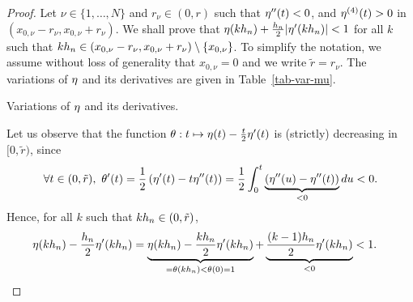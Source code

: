 \begin{proof}
  Let $\nu\in \{1,\ldots, N\}$ and $r_\nu\in (0,r)$ such that $\eta''(t)<0$, and $\eta^{(4)}(t)>0$ in $(x_{0,\nu}-r_\nu,x_{0,\nu}+r_\nu)$.
  We shall prove that $\eta(k{h_n})+\frac{{h_n}}{2} |\eta'(k{h_n})|<1$ for all $k$ such that $k{h_n}\in (x_{0,\nu}-r_\nu,x_{0,\nu}+r_\nu)\setminus \{x_{0,\nu}\}$.
  To simplify the notation, we assume without loss of generality that $x_{0,\nu}=0$ and we write $\tilde{r}=r_\nu$. The variations of $\eta$ and its derivatives are given in Table~\ref{tab-var-mu}.

\begin{table}
\begin{center}
\end{center}
\caption{Variations of $\eta$ and its derivatives. }\label{tab-var-mu}
\end{table}

Let us observe that the function $\theta : t \mapsto \eta(t)-\frac{t}{2} \eta'(t)$ is (strictly) decreasing in $[0,\tilde{r})$, since 
  \begin{align}
    \forall t\in (0,\tilde{r}),\    \theta'(t)=\frac{1}{2} \left(\eta'(t)-t\eta''(t) \right)=\frac{1}{2} \int_0^t\underbrace{(\eta''(u)-\eta''(t))}_{<0}du<0.
  \end{align}
  Hence, for all $k$ such that $k{h_n}\in (0,\tilde{r})$, 
  \begin{align}
    \eta(k{h_n})-\frac{{h_n}}{2} \eta'(k{h_n}) &=\underbrace{\eta(k{h_n})-\frac{k{h_n}}{2} \eta'(k{h_n})}_{=\theta(k{h_n})<\theta(0)=1} + \underbrace{\frac{(k-1){h_n}}{2} \eta'(k{h_n})}_{<0}<1.
  \end{align}


\end{proof}
